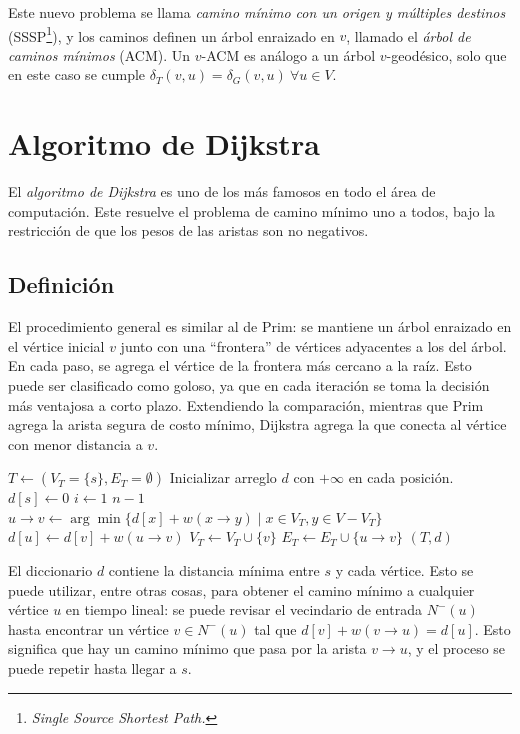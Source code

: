 \documentclass[a4paper]{report}
\begin{document}
Este nuevo problema se llama \textit{camino mínimo con un origen y múltiples destinos} (SSSP\footnote{\textit{Single Source Shortest Path.}}), y los caminos definen un árbol enraizado en $v$, llamado el \textit{árbol de caminos mínimos} (ACM). Un $v$-ACM es análogo a un árbol $v$-geodésico, solo que en este caso se cumple $\delta_T(v, u) = \delta_G(v, u)\ \forall u \in V$.

\section{Algoritmo de Dijkstra}

El \textit{algoritmo de Dijkstra} es uno de los más famosos en todo el área de computación. Este resuelve el problema de camino mínimo uno a todos, bajo la restricción de que los pesos de las aristas son no negativos.

\subsection{Definición}

El procedimiento general es similar al de Prim: se mantiene un árbol enraizado en el vértice inicial $v$ junto con una ``frontera'' de vértices adyacentes a los del árbol. En cada paso, se agrega el vértice de la frontera más cercano a la raíz. Esto puede ser clasificado como goloso, ya que en cada iteración se toma la decisión más ventajosa a corto plazo. Extendiendo la comparación, mientras que Prim agrega la arista segura de costo mínimo, Dijkstra agrega la que conecta al vértice con menor distancia a $v$.

\begin{codebox}
    \li $T \gets (V_T = \{s\}, E_T = \emptyset)$
    \li Inicializar arreglo $d$ con $+\infty$ en cada posición.
    \li $d[s] \gets 0$
    \li \For $i \gets 1$ \To $n - 1$ \Do
    \li $u \rightarrow v \gets \arg\min{\{d[x] + w(x \rightarrow y) \mid x \in V_T, y \in V - V_T\}}$
    \li $d[u] \gets d[v] + w(u \rightarrow v)$
    \li $V_T \gets V_T \cup \{v\}$
    \li $E_T \gets E_T \cup \{u \rightarrow v\}$
    \End
    \li \Return $(T, d)$
\end{codebox}

El diccionario $d$ contiene la distancia mínima entre $s$ y cada vértice. Esto se puede utilizar, entre otras cosas, para obtener el camino mínimo a cualquier vértice $u$ en tiempo lineal: se puede revisar el vecindario de entrada $N^-(u)$ hasta encontrar un vértice $v \in N^-(u)$ tal que $d[v] + w(v \rightarrow u) = d[u]$. Esto significa que hay un camino mínimo que pasa por la arista $v \rightarrow u$, y el proceso se puede repetir hasta llegar a $s$.
\end{document}
